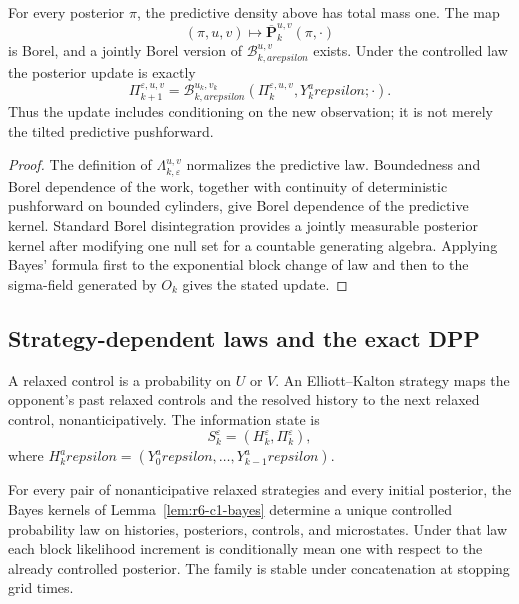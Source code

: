 \begin{lemma}
\label{lem:r6-c1-bayes}
For every posterior \(\pi\), the predictive density above has total mass one.
The map
\[
(\pi,u,v)\longmapsto
\overline{\mathbf P}_{k}^{u,v}(\pi,\cdot)
\]
is Borel, and a jointly Borel version of
\(\mathcal B_{k,arepsilon}^{u,v}\) exists.  Under the controlled law the
posterior update is exactly
\[
\Pi_{k+1}^{\varepsilon,u,v}
=
\mathcal B_{k,arepsilon}^{u_k,v_k}
(\Pi_k^{\varepsilon,u,v},Y_k^arepsilon;\cdot).
\]
Thus the update includes conditioning on the new observation; it is not merely
the tilted predictive pushforward.
\end{lemma}

\begin{proof}
The definition of \(\Lambda_{k,\varepsilon}^{u,v}\) normalizes the predictive
law.  Boundedness and Borel dependence of the work, together with continuity
of deterministic pushforward on bounded cylinders, give Borel dependence of
the predictive kernel.  Standard Borel disintegration provides a jointly
measurable posterior kernel after modifying one null set for a countable
generating algebra.  Applying Bayes' formula first to the exponential block
change of law and then to the sigma-field generated by \(O_k\) gives the
stated update.
\end{proof}

\subsection{Strategy-dependent laws and the exact DPP}

A relaxed control is a probability on \(U\) or \(V\).  An Elliott--Kalton
strategy maps the opponent's past relaxed controls and the resolved history to
the next relaxed control, nonanticipatively.  The information state is
\[
S_k^\varepsilon=(H_k^\varepsilon,\Pi_k^\varepsilon),
\]
where \(H_k^arepsilon=(Y_0^arepsilon,\ldots,Y_{k-1}^arepsilon)\).

\begin{theorem}
\label{thm:r6-c1-law}
For every pair of nonanticipative relaxed strategies and every initial
posterior, the Bayes kernels of Lemma~\ref{lem:r6-c1-bayes} determine a unique
controlled probability law on histories, posteriors, controls, and
microstates.  Under that law each block likelihood increment is conditionally
mean one with respect to the already controlled posterior.  The family is
stable under concatenation at stopping grid times.
\end{theorem}

